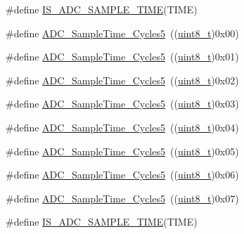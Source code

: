 \begin{DoxyCompactItemize}
\item 
\#define \hyperlink{group___a_d_c__sampling__time_ga30e0307fa009e1c383d3047b48e94644}{I\+S\+\_\+\+A\+D\+C\+\_\+\+S\+A\+M\+P\+L\+E\+\_\+\+T\+I\+ME}(T\+I\+ME)
\item 
\#define \hyperlink{group___a_d_c__sampling__time_gad085065e48857ada890863a7db575c6e}{A\+D\+C\+\_\+\+Sample\+Time\+\_\+Cycles5}~((\hyperlink{_p_e___types_8h_aba7bc1797add20fe3efdf37ced1182c5}{uint8\+\_\+t})0x00)
\item 
\#define \hyperlink{group___a_d_c__sampling__time_gac4101073619c4d79efa28a477696b3f5}{A\+D\+C\+\_\+\+Sample\+Time\+\_\+Cycles5}~((\hyperlink{_p_e___types_8h_aba7bc1797add20fe3efdf37ced1182c5}{uint8\+\_\+t})0x01)
\item 
\#define \hyperlink{group___a_d_c__sampling__time_gaef37e223e826ac5e6ee5ef30881f9b27}{A\+D\+C\+\_\+\+Sample\+Time\+\_\+Cycles5}~((\hyperlink{_p_e___types_8h_aba7bc1797add20fe3efdf37ced1182c5}{uint8\+\_\+t})0x02)
\item 
\#define \hyperlink{group___a_d_c__sampling__time_ga6251e64783f7a6562e17e71f7edd68d8}{A\+D\+C\+\_\+\+Sample\+Time\+\_\+Cycles5}~((\hyperlink{_p_e___types_8h_aba7bc1797add20fe3efdf37ced1182c5}{uint8\+\_\+t})0x03)
\item 
\#define \hyperlink{group___a_d_c__sampling__time_gadc3d26f9bf5fa6589889cc938c66e0e7}{A\+D\+C\+\_\+\+Sample\+Time\+\_\+Cycles5}~((\hyperlink{_p_e___types_8h_aba7bc1797add20fe3efdf37ced1182c5}{uint8\+\_\+t})0x04)
\item 
\#define \hyperlink{group___a_d_c__sampling__time_ga6a6fbbadc0e35a719fb749bf6b0704d6}{A\+D\+C\+\_\+\+Sample\+Time\+\_\+Cycles5}~((\hyperlink{_p_e___types_8h_aba7bc1797add20fe3efdf37ced1182c5}{uint8\+\_\+t})0x05)
\item 
\#define \hyperlink{group___a_d_c__sampling__time_gae46e8978ac3160969156739ddb867dae}{A\+D\+C\+\_\+\+Sample\+Time\+\_\+Cycles5}~((\hyperlink{_p_e___types_8h_aba7bc1797add20fe3efdf37ced1182c5}{uint8\+\_\+t})0x06)
\item 
\#define \hyperlink{group___a_d_c__sampling__time_ga93117dc4090dc4e3e84e0eef6d6ab073}{A\+D\+C\+\_\+\+Sample\+Time\+\_\+Cycles5}~((\hyperlink{_p_e___types_8h_aba7bc1797add20fe3efdf37ced1182c5}{uint8\+\_\+t})0x07)
\item 
\#define \hyperlink{group___a_d_c__sampling__time_ga30e0307fa009e1c383d3047b48e94644}{I\+S\+\_\+\+A\+D\+C\+\_\+\+S\+A\+M\+P\+L\+E\+\_\+\+T\+I\+ME}(T\+I\+ME)
\end{DoxyCompactItemize}


